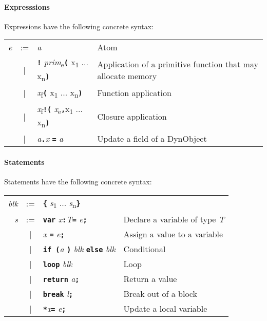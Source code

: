 \documentclass{book}
\newcommand{\kw}[1]{\textbf{\texttt{#1}}}
\newcommand{\metavar}[1]{\textit{#1}}
\begin{document}
\paragraph{Expresssions}
Expressions have the following concrete syntax:

\begin{tabular}{rcll}
\metavar{e} & := & \metavar{a} 
                 & Atom \\
            & |  & \kw{!} \metavar{prim}\textsubscript{e}\kw{(} x\textsubscript{1} ... x\textsubscript{n}\kw{)}            
                 & Application of a primitive function that may allocate memory \\
            & |  & \metavar{x}\textsubscript{f}\kw{(} x\textsubscript{1} ... x\textsubscript{n}\kw{)}
                 & Function application \\
            & |  & \metavar{x}\textsubscript{f}\kw{!(} \metavar{x}\textsubscript{e}\kw{,}x\textsubscript{1} ... x\textsubscript{n}\kw{)}
                 & Closure application \\
            & |  & \metavar{a}\kw{.}\metavar{x} \kw{=} \metavar{a}
                 & \textrm{Update a field of a DynObject} \\
\end{tabular}

\paragraph{Statements}
Statements have the following concrete syntax:

\begin{tabular}{rcll}
\metavar{blk} & := & \kw{\{} \metavar{s}\textsubscript{1} ... \metavar{s}\textsubscript{n}\kw{\}} \\
\metavar{s} & := & \kw{var} \metavar{x}\kw{:}\metavar{T}\kw{=} \metavar{e}\kw{;}
                 & \textrm{Declare a variable of type \metavar{T}} \\
            & |  & \metavar{x} \kw{=} \metavar{e}\kw{;}
                 & \textrm{Assign a value to a variable} \\
            & |  & \kw{if (}\metavar{a} \kw{)} \metavar{blk} \kw{else} \metavar{blk}
                 & \textrm{Conditional} \\
            & |  & \kw{loop} \metavar{blk}
                 & \textrm{Loop} \\
            & |  & \kw{return} \metavar{a}\kw{;}
                 & \textrm{Return a value} \\
            & |  & \kw{break} \metavar{l}\kw{;}
                 & \textrm{Break out of a block} \\
            & |  & \kw{*}\metavar{x}\kw{=} \metavar{e}\kw{;}
                 & \textrm{Update a local variable} \\
\end{tabular}
\end{document}
